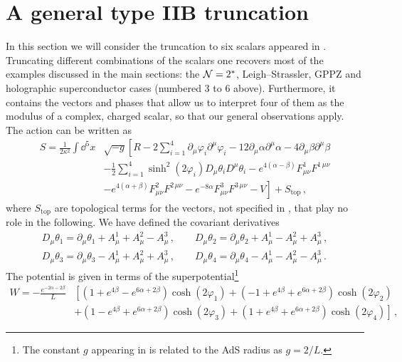 \section{A general type IIB truncation}\label{app:trunc}

In this section we will consider the truncation to six scalars appeared in \cite{Khavaev:2000gb,Bobev:2010de}.
Truncating different combinations of the scalars one recovers most of the examples discussed in the main sections: the $\mathcal{N}=2^*$, Leigh--Strassler, GPPZ and holographic superconductor cases (numbered 3 to 6 above).
Furthermore, it contains the vectors and phases that allow us to interpret four of them as the modulus of a complex, charged scalar, so that our general observations apply.
The action can be written as 
\begin{align}
S=\frac{1}{2\kappa^2}\int\dd^5x & \sqrt{-g}\left[R-2\sum_{i=1}^4\partial_\mu\varphi_i\partial^\mu\varphi_i-12\partial_\mu\alpha\partial^\mu\alpha-4\partial_\mu\beta\partial^\mu\beta\right.\nonumber\\[2mm]
&\left.-\frac12\sum_{i=1}^4\sinh^2(2\varphi_i)D_\mu\theta_i D^\mu\theta_i-e^{4(\alpha-\beta)}F_{\mu\nu}^1F^{1\,\mu\nu}\right.\nonumber\\[2mm]
&\left.-e^{4(\alpha+\beta)}F_{\mu\nu}^2F^{2\,\mu\nu}-e^{-8\alpha}F_{\mu\nu}^3F^{3\,\mu\nu}-V\right]+S_{\text{top}}\,,
\end{align}
where $S_{\text{top}}$ are topological terms for the vectors, not specified in \cite{Bobev:2010de}, that play no role in the following.
We have defined the covariant derivatives
\begin{align}
D_\mu\theta_1=\partial_\mu\theta_1+A_\mu^1+A_\mu^2-A_\mu^3\,,\qquad D_\mu\theta_2=\partial_\mu\theta_2+A_\mu^1-A_\mu^2+A_\mu^3\,,\nonumber\\[2mm]
D_\mu\theta_3=\partial_\mu\theta_3-A_\mu^1+A_\mu^2+A_\mu^3\,,\qquad D_\mu\theta_4=\partial_\mu\theta_4-A_\mu^1-A_\mu^2-A_\mu^3\,.
\end{align} 
The potential is given in terms of the superpotential\footnote{The constant $g$ appearing in \cite{Khavaev:2000gb,Bobev:2010de} is related to the AdS radius as $g=2/L$.} 
\begin{align}
W=-\frac{e^{-2\alpha-2\beta}}{L}&\left[\left(1+e^{4\beta}-e^{6\alpha+2\beta}\right)\cosh(2\varphi_1)+\left(-1+e^{4\beta}+e^{6\alpha+2\beta}\right)\cosh(2\varphi_2)\right.\nonumber\\[2mm]
&\left.+\left(1-e^{4\beta}+e^{6\alpha+2\beta}\right)\cosh(2\varphi_3)+\left(1+e^{4\beta}+e^{6\alpha+2\beta}\right)\cosh(2\varphi_4)\right]\,,
\end{align}
